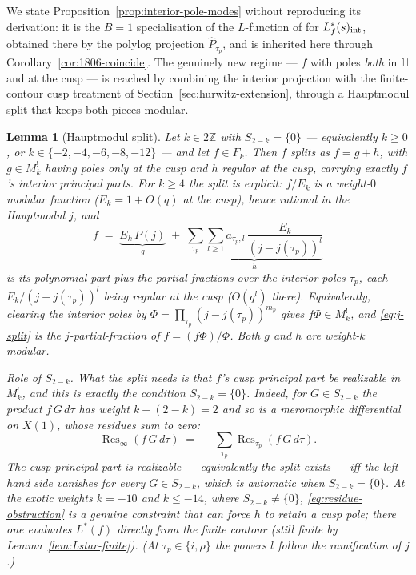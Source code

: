 \documentclass[11pt]{article}
\newtheorem{lemma}[theorem]{Lemma}
\numberwithin{equation}{section}  %
\newcommand{\HH}{\mathbb{H}}
\newcommand{\ZZ}{\mathbb{Z}}
\DeclareMathOperator{\Res}{Res}
\begin{document}
We state Proposition~\ref{prop:interior-pole-modes} without
reproducing its derivation: it is the $B = 1$ specialisation of the
$L$-function of \cite[\S2]{1806} for $L_f^*(s)_{\rm int}$, obtained
there by the polylog projection $\widehat{P}_{\tau_p}$, and is
inherited here through Corollary~\ref{cor:1806-coincide}.  The
genuinely new regime --- $f$ with poles \emph{both} in $\HH$ and at the
cusp --- is reached by combining the interior projection with the
finite-contour cusp treatment of Section~\ref{sec:hurwitz-extension}, through
a Hauptmodul split that keeps both pieces modular.

\begin{lemma}[Hauptmodul split]\label{lem:j-split}
Let $k \in 2\ZZ$ with $S_{2-k} = \{0\}$ --- equivalently $k \ge 0$, or
$k \in \{-2, -4, -6, -8, -12\}$ --- and let $f \in F_k$.  Then $f$ splits
as $f = g + h$, with $g \in M^!_k$ having poles only at the cusp and $h$
regular at the cusp, carrying exactly $f$'s interior principal parts.
For $k \ge 4$ the split is explicit: $f/E_k$ is a weight-$0$ modular
function ($E_k = 1 + O(q)$ at the cusp), hence rational in the Hauptmodul
$j$, and
\begin{equation}\label{eq:j-split}
  f \;=\; \underbrace{E_k\,P(j)}_{\textstyle g}
  \;+\; \underbrace{\sum_{\tau_p}\sum_{l \ge 1} a_{\tau_p, l}\,
        \frac{E_k}{(j - j(\tau_p))^{l}}}_{\textstyle h}
\end{equation}
is its polynomial part plus the partial fractions over the interior
poles $\tau_p$, each $E_k/(j - j(\tau_p))^{l}$ being regular at the cusp
($O(q^{l})$ there).  Equivalently, clearing the interior poles by
$\Phi = \prod_{\tau_p}(j - j(\tau_p))^{m_p}$ gives $f\Phi \in M^!_k$, and
\eqref{eq:j-split} is the $j$-partial-fraction of $f = (f\Phi)/\Phi$.
Both $g$ and $h$ are weight-$k$ modular.

\emph{Role of $S_{2-k}$.}  What the split needs is that $f$'s cusp
principal part be realizable in $M^!_k$, and this is exactly the
condition $S_{2-k} = \{0\}$.  Indeed, for $G \in S_{2-k}$ the product
$f\,G\,d\tau$ has weight $k + (2-k) = 2$ and so is a meromorphic
differential on $X(1)$, whose residues sum to zero:
\begin{equation}\label{eq:residue-obstruction}
  \Res_{\infty}(f\,G\,d\tau) \;=\; -\sum_{\tau_p}\Res_{\tau_p}(f\,G\,d\tau).
\end{equation}
The cusp principal part is realizable --- equivalently the split exists
--- iff the left-hand side vanishes for every $G \in S_{2-k}$, which is
automatic when $S_{2-k} = \{0\}$.  At the exotic weights $k = -10$ and
$k \le -14$, where $S_{2-k} \ne \{0\}$, \eqref{eq:residue-obstruction}
is a genuine constraint that can force $h$ to retain a cusp pole; there
one evaluates $L^*(f)$ directly from the finite contour (still finite by
Lemma~\ref{lem:Lstar-finite}).  (At $\tau_p \in \{i, \rho\}$ the powers
$l$ follow the ramification of $j$.)
\end{lemma}
\end{document}
